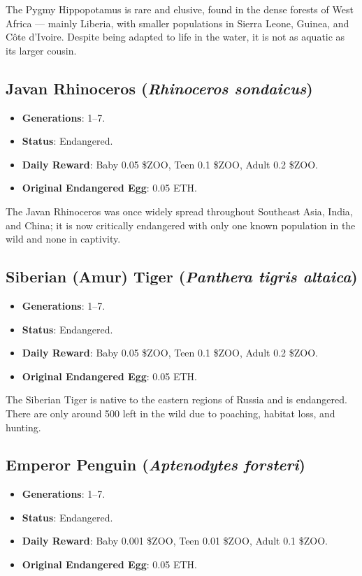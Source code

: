 The Pygmy Hippopotamus is rare and elusive, found in the dense forests of West Africa --- mainly Liberia, with smaller populations in Sierra Leone, Guinea, and Côte d'Ivoire. Despite being adapted to life in the water, it is not as aquatic as its larger cousin.

\subsection{Javan Rhinoceros (\textit{Rhinoceros sondaicus})}

\begin{itemize}
  \item \textbf{Generations}: 1--7.
  \item \textbf{Status}: Endangered.
  \item \textbf{Daily Reward}: Baby 0.05 \$ZOO, Teen 0.1 \$ZOO, Adult 0.2 \$ZOO.
  \item \textbf{Original Endangered Egg}: 0.05 ETH.
\end{itemize}

The Javan Rhinoceros was once widely spread throughout Southeast Asia, India, and China; it is now critically endangered with only one known population in the wild and none in captivity.

\subsection{Siberian (Amur) Tiger (\textit{Panthera tigris altaica})}

\begin{itemize}
  \item \textbf{Generations}: 1--7.
  \item \textbf{Status}: Endangered.
  \item \textbf{Daily Reward}: Baby 0.05 \$ZOO, Teen 0.1 \$ZOO, Adult 0.2 \$ZOO.
  \item \textbf{Original Endangered Egg}: 0.05 ETH.
\end{itemize}

The Siberian Tiger is native to the eastern regions of Russia and is endangered. There are only around 500 left in the wild due to poaching, habitat loss, and hunting.

\subsection{Emperor Penguin (\textit{Aptenodytes forsteri})}

\begin{itemize}
  \item \textbf{Generations}: 1--7.
  \item \textbf{Status}: Endangered.
  \item \textbf{Daily Reward}: Baby 0.001 \$ZOO, Teen 0.01 \$ZOO, Adult 0.1 \$ZOO.
  \item \textbf{Original Endangered Egg}: 0.05 ETH.
\end{itemize}

